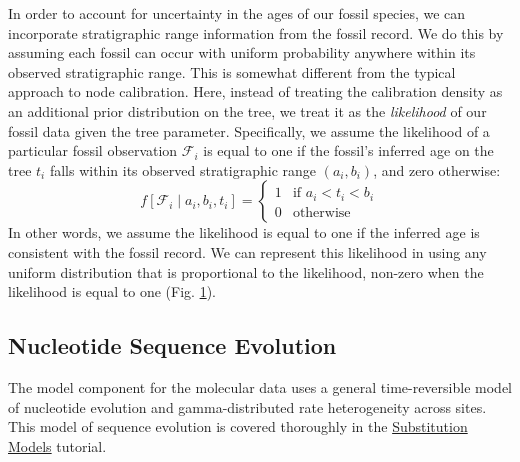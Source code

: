In order to account for uncertainty in the ages of our fossil species, we can incorporate stratigraphic range information from the fossil record.
We do this by assuming each fossil can occur with uniform probability anywhere within its observed stratigraphic range.
This is somewhat different from the typical approach to node calibration.
Here, instead of treating the calibration density as an additional prior distribution on the tree, we treat it as the \textit{likelihood} of our fossil data given the tree parameter.
Specifically, we assume the likelihood of a particular fossil observation $\mathcal{F}_i$ is equal to one if the fossil's inferred age on the tree $t_i$ falls within its observed stratigraphic range $(a_i,b_i)$, and zero otherwise:
$$f[\mathcal{F}_i \mid a_i, b_i, t_i] = \begin{cases}
1 & \text{if } a_i < t_i < b_i\\
0 & \text{otherwise}
\end{cases}$$
In other words, we assume the likelihood is equal to one if the inferred age is consistent with the fossil record.
We can represent this likelihood in \RevBayes using any uniform distribution that is proportional to the likelihood, \IE non-zero when the likelihood is equal to one (Fig. \ref{fig:tipsampling_gm}).
\begin{figure}[h!]
\label{fig:tipsampling_gm}
\end{figure}


\subsection{Nucleotide Sequence Evolution}\label{subsect:Intro-GTR}

The model component for the molecular data uses a general time-reversible model of nucleotide evolution and gamma-distributed rate heterogeneity across sites. %
This model of sequence evolution is covered thoroughly in the \href{https://github.com/revbayes/revbayes_tutorial/raw/master/tutorial_TeX/RB_CTMC_Tutorial/RB_CTMC_Tutorial.pdf}{Substitution Models} tutorial.



